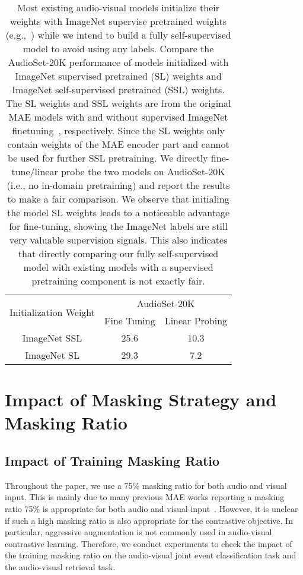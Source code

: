 \documentclass{article} \usepackage{iclr2023_conference,times}
\begin{document}
\begin{table}[!h]
\centering
\caption{Most existing audio-visual models initialize their weights with ImageNet supervise pretrained weights (e.g.,~\cite{nagrani2021attention,rouditchenko2021avlnet}) while we intend to build a fully self-supervised model to avoid using any labels. Compare the AudioSet-20K performance of models initialized with ImageNet supervised pretrained (SL) weights and ImageNet self-supervised pretrained (SSL) weights. The SL weights and SSL weights are from the original MAE models with and without supervised ImageNet finetuning~\citep{he2022masked}, respectively. Since the SL weights only contain weights of the MAE encoder part and cannot be used for further SSL pretraining. We directly fine-tune/linear probe the two models on AudioSet-20K (i.e., no in-domain pretraining) and report the results to make a fair comparison. We observe that initialing the model SL weights leads to a noticeable advantage for fine-tuning, showing the ImageNet labels are still very valuable supervision signals. This also indicates that directly comparing our fully self-supervised model with existing models with a supervised pretraining component is not exactly fair.}
\label{tab:slvsssl}
\begin{tabular}{@{}ccc@{}}
\toprule
\multirow{2}{*}{Initialization Weight} & \multicolumn{2}{c}{AudioSet-20K} \\ \cmidrule(l){2-3} 
                                       & Fine Tuning   & Linear Probing  \\ \midrule
ImageNet SSL                           & 25.6          & 10.3            \\
ImageNet SL                            & 29.3          & 7.2             \\ \bottomrule
\end{tabular}
\end{table}

\section{Impact of Masking Strategy and Masking Ratio}
\label{sec:impact_masking}

\subsection{Impact of Training Masking Ratio}

Throughout the paper, we use a 75\% masking ratio for both audio and visual input. This is mainly due to many previous MAE works reporting a masking ratio 75\% is appropriate for both audio and visual input~\cite{he2022masked,baade2022mae,xu2022masked,niizumi2022masked}. However, it is unclear if such a high masking ratio is also appropriate for the contrastive objective. In particular, aggressive augmentation is not commonly used in audio-visual contrastive learning. Therefore, we conduct experiments to check the impact of the training masking ratio on the audio-visual joint event classification task and the audio-visual retrieval task.
\end{document}

